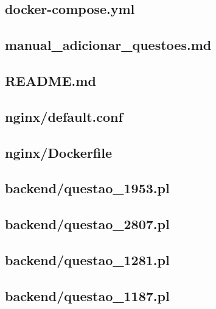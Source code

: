 \subsection*{docker-compose.yml}


\subsection*{manual\_adicionar\_questoes.md}


\subsection*{README.md}


\subsection*{nginx/default.conf}


\subsection*{nginx/Dockerfile}


\subsection*{backend/questao\_1953.pl}


\subsection*{backend/questao\_2807.pl}


\subsection*{backend/questao\_1281.pl}


\subsection*{backend/questao\_1187.pl}


